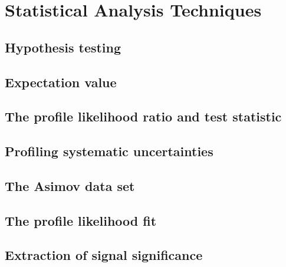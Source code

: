 \chapter{Statistical Analysis Techniques}
\label{chap:statistics}

\section{Hypothesis testing}
\section{Expectation value}
\section{The profile likelihood ratio and test statistic}
\section{Profiling systematic uncertainties}
\section{The Asimov data set}
\section{The profile likelihood fit}
\section{Extraction of signal significance}

